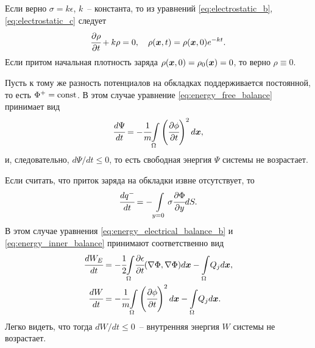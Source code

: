 \begin{remark}
\label{rem:Phi_constant}
Если верно $\sigma = k\epsilon$, $k$~-- константа, то из уравнений \eqref{eq:electrostatic_b}, \eqref{eq:electrostatic_c} следует
\[
    \cfrac{\partial \rho}{\partial t} + k \rho = 0, \quad \rho({\boldsymbol{x}}, t) = \rho({\boldsymbol{x}}, 0) e^{-kt}.
\]
Если притом начальная плотность заряда $\rho({\boldsymbol{x}}, 0) = \rho_0({\boldsymbol{x}}) = 0$, то верно $\rho \equiv 0$.

Пусть к тому же разность потенциалов на обкладках поддерживается постоянной, то есть $\Phi^+ = \operatorname{{const}}$. В этом случае уравнение \eqref{eq:energy_free_balance} принимает вид
\begin{equation}
    \cfrac{d \Psi}{dt} = -\cfrac{1}{m} {\int\limits_\Omega} \left( \cfrac{\partial \phi}{\partial t} \right)^2 d {\boldsymbol{x}},
    \label{eq:energy_free_decrease}
\end{equation}
и, следовательно, $d \Psi / dt \leq 0$, то есть свободная энергия $\Psi$ системы не возрастает.
\end{remark}

\begin{remark}
\label{rem:charge_conservative}
Если считать, что приток заряда на обкладки извне отсутствует, то
\[
    \cfrac{d q^-}{dt} = -\int\limits_{y = 0} \sigma \cfrac{\partial \Phi}{\partial y} dS.
\]
В этом случае уравнения \eqref{eq:energy_electrical_balance_b} и \eqref{eq:energy_inner_balance} принимают соответственно вид
\begin{align*}
    \cfrac{d W_E}{dt} & = -\cfrac{1}{2} {\int\limits_\Omega} \cfrac{\partial \epsilon}{\partial t} (\nabla \Phi, \nabla \Phi) d {\boldsymbol{x}} - {\int\limits_\Omega} Q_j d {\boldsymbol{x}}, \\
    \cfrac{dW}{dt} & = -\cfrac{1}{m} {\int\limits_\Omega} \left( \cfrac{\partial \phi}{\partial t} \right)^2 d {\boldsymbol{x}} - {\int\limits_\Omega} Q_j d {\boldsymbol{x}}.
\end{align*}
Легко видеть, что тогда $dW / dt \leq 0$~-- внутренняя энергия $W$ системы не возрастает.
\end{remark}

